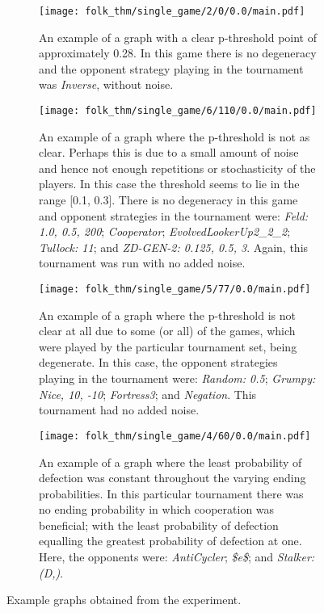 \begin{figure}
    \begin{subfigure}{.45\textwidth}
        \centering
        \texttt{[image: folk\_thm/single\_game/2/0/0.0/main.pdf]}
        \caption{An example of a graph with a clear p-threshold point of approximately 0.28. In this game there is no degeneracy and the opponent strategy playing in the tournament was \textit{Inverse}, without noise.}\label{subfig:clear_thresh_plot}
    \end{subfigure}
    \begin{subfigure}{.45\textwidth}
        \centering
        \texttt{[image: folk\_thm/single\_game/6/110/0.0/main.pdf]}
        \caption{An example of a graph where the p-threshold is not as clear. Perhaps this is due to a small amount of noise and hence not enough repetitions or stochasticity of the players. In this case the threshold seems to lie in the range [0.1, 0.3]. There is no degeneracy in this game and opponent strategies in the tournament were: \textit{Feld: 1.0, 0.5, 200}; \textit{Cooperator};  \textit{EvolvedLookerUp2\_2\_2}; \textit{Tullock: 11}; and \textit{ZD-GEN-2: 0.125, 0.5, 3}. Again, this tournament was run with no added noise.}\label{subfig:unclear_thresh_plot}
    \end{subfigure}

    \begin{subfigure}{.45\textwidth}
        \centering
        \texttt{[image: folk\_thm/single\_game/5/77/0.0/main.pdf]}
        \caption{An example of a graph where the p-threshold is not clear at all due to some (or all) of the games, which were played by the particular tournament set, being degenerate. In this case, the opponent strategies playing in the tournament were: \textit{Random: 0.5}; \textit{Grumpy: Nice, 10, -10}; \textit{Fortress3}; and \textit{Negation}. This tournament had no added noise.}\label{subfig:degenerate_plot}
    \end{subfigure}
    \begin{subfigure}{.45\textwidth}
        \centering
        \texttt{[image: folk\_thm/single\_game/4/60/0.0/main.pdf]}
        \caption{An example of a graph where the least probability of defection
        was constant throughout the varying ending probabilities. In this
        particular tournament there was no ending probability in which
        cooperation was beneficial; with the least probability of defection
        equalling the greatest probability of defection at one. Here, the
        opponents were: \textit{AntiCycler}; \textit{\$e\$}; and
        \textit{Stalker: (D,)}.}\label{subfig:constant_plot}
    \end{subfigure}
    \caption{Example graphs obtained from the experiment.}\label{fig:example_graphs}
\end{figure}

